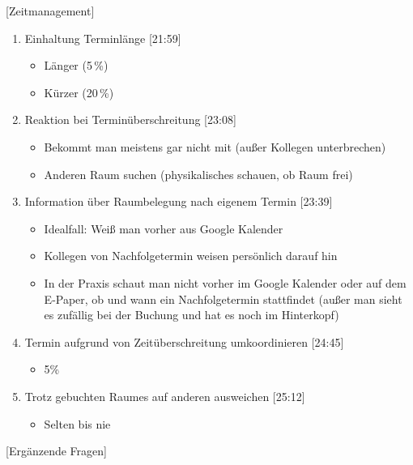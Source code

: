 [Zeitmanagement]

\begin{enumerate}

    \item Einhaltung Terminlänge [21:59]
     \begin{itemize}
        \item Länger (5\,\%)
        \item Kürzer (20\,\%)
    \end{itemize}
    
    \item Reaktion bei Terminüberschreitung [23:08]
     \begin{itemize}
        \item Bekommt man meistens gar nicht mit (außer Kollegen unterbrechen)
        \item Anderen Raum suchen (physikalisches schauen, ob Raum frei)
    \end{itemize}
    
    \item Information über Raumbelegung nach eigenem Termin [23:39]
     \begin{itemize}
        \item Idealfall: Weiß man vorher aus Google Kalender
        \item Kollegen von Nachfolgetermin weisen persönlich darauf hin 
        \item In der Praxis schaut man nicht vorher im Google Kalender oder auf dem E-Paper, ob und wann ein Nachfolgetermin stattfindet (außer man sieht es zufällig bei der Buchung und hat es noch im Hinterkopf)
    \end{itemize}
    
    \item Termin aufgrund von Zeitüberschreitung umkoordinieren [24:45]
     \begin{itemize}
        \item 5\% 
    \end{itemize}

    \item Trotz gebuchten Raumes auf anderen ausweichen [25:12]
     \begin{itemize}
        \item Selten bis nie
    \end{itemize}

\end{enumerate}

[Ergänzende Fragen]

